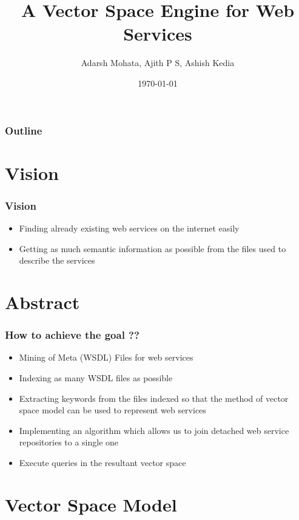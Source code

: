 \documentclass[12pt,xcolor=dvipsnames]{beamer}
\title{A Vector Space Engine for Web Services  \cite{vector}}
\author{Adarsh Mohata, Ajith P S, Ashish Kedia}
\date{\today}
\begin{document}
\begin{frame}
\titlepage
\end{frame}


\begin{frame}
\frametitle{Outline}
\begin{multicols}{2}
\tableofcontents[hideallsubsections]
\end{multicols}
\end{frame}

\section{Vision}
\begin{frame}
\frametitle{Vision}
\begin{itemize}
 \item Finding already existing web services on the internet easily
 \item Getting as much semantic information as possible from the files used to describe the services
\end{itemize}
\end{frame}

\section{Abstract}
\begin{frame}
\frametitle{How to achieve the goal ??}
\begin{itemize}
 \item Mining of Meta (WSDL) Files for web services
 \item Indexing as many WSDL files as possible
 \item Extracting keywords from the files indexed so that the method of vector space model can be used to represent web services
 \item Implementing an algorithm which allows us to join detached web service repositories to a single one
 \item Execute queries in the resultant vector space
\end{itemize}
\end{frame}

\section{Vector Space Model}
\end{document}
